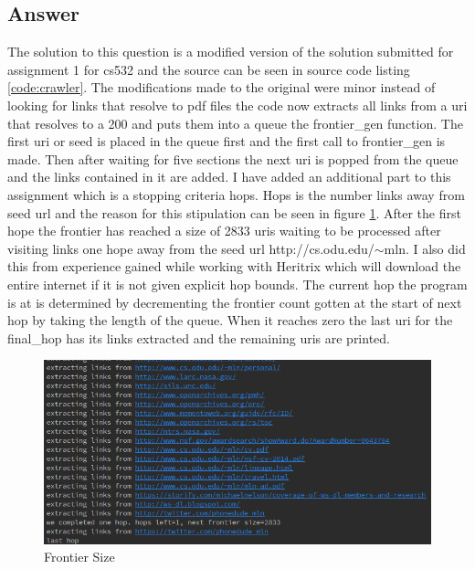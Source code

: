 \documentclass[11pt]{article}
\newenvironment{code}{\captionsetup{type=listing}}{}
\begin{document}
\subsection{Answer}
\setcounter{listing}{1}
The solution to this question is a modified version of the solution submitted for assignment 1 for cs532 and the source can be seen in source code listing \hyperref[code:crawler]{\ref{code:crawler}}.
The modifications made to the original were minor instead of looking for links that resolve to pdf files the code now extracts all links from a uri that resolves to a 200 and puts them into a queue the frontier\_gen function. 
The first uri or seed is placed in the queue first and the first call to frontier\_gen is made. Then after waiting for five sections the next uri is popped from the queue and the links contained in it are added. I have added an additional part to this assignment which is a stopping criteria hops. Hops is the number links away from seed url and the reason for this stipulation can be seen in figure \hyperref[fig:frontierSize]{\ref{fig:frontierSize}}. After the first hope the frontier has reached a size of 2833 uris waiting to be processed after visiting links one hope away from the seed url http://cs.odu.edu/$\sim$mln. I also did this from experience gained while working with Heritrix which will download the entire internet if it is not given explicit hop bounds.
The current hop the program is at is determined by decrementing the frontier count gotten at the start of next hop by taking the length of the queue. When it reaches zero the last uri for the final\_hop has its links extracted and the remaining uris are printed. 
\begin{figure}[h]
	\centering
	\includegraphics[scale=0.5]{crawlerOutput.png}
	\caption{Frontier Size} \label{fig:frontierSize}
\end{figure}
\begin{code}
	\label{code:crawler}
\end{code}
\newpage
\clearpage
\end{document}
